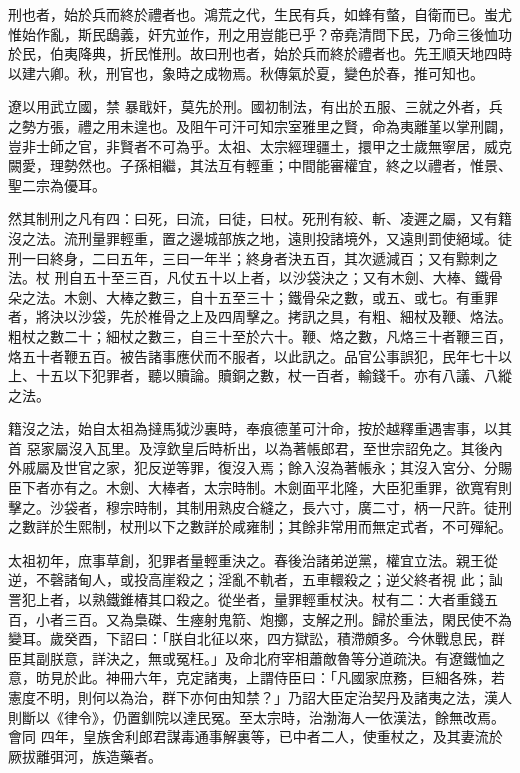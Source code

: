 
\begin{pinyinscope}

 刑也者，始於兵而終於禮者也。鴻荒之代，生民有兵，如蜂有螫，自衛而已。蚩尤惟始作亂，斯民鴟義，奸宄並作，刑之用豈能已乎？帝堯清問下民，乃命三後恤功於民，伯夷降典，折民惟刑。故曰刑也者，始於兵而終於禮者也。先王順天地四時以建六卿。秋，刑官也，象時之成物焉。秋傳氣於夏，變色於春，推可知也。



 遼以用武立國，禁
 暴戢奸，莫先於刑。國初制法，有出於五服、三就之外者，兵之勢方張，禮之用未遑也。及阻午可汗可知宗室雅里之賢，命為夷離堇以掌刑闢，豈非士師之官，非賢者不可為乎。太祖、太宗經理疆土，擐甲之士歲無寧居，威克闕愛，理勢然也。子孫相繼，其法互有輕重；中間能審權宜，終之以禮者，惟景、聖二宗為優耳。



 然其制刑之凡有四：曰死，曰流，曰徒，曰杖。死刑有絞、斬、凌遲之屬，又有籍沒之法。流刑量罪輕重，置之邊城部族之地，遠則投諸境外，又遠則罰使絕域。徒刑一曰終身，二曰五年，三曰一年半；終身者決五百，其次遞減百；又有黥刺之法。杖
 刑自五十至三百，凡仗五十以上者，以沙袋決之；又有木劍、大棒、鐵骨朵之法。木劍、大棒之數三，自十五至三十；鐵骨朵之數，或五、或七。有重罪者，將決以沙袋，先於椎骨之上及四周擊之。拷訊之具，有粗、細杖及鞭、烙法。粗杖之數二十；細杖之數三，自三十至於六十。鞭、烙之數，凡烙三十者鞭三百，烙五十者鞭五百。被告諸事應伏而不服者，以此訊之。品官公事誤犯，民年七十以上、十五以下犯罪者，聽以贖論。贖銅之數，杖一百者，輸錢千。亦有八議、八縱之法。



 籍沒之法，始自太祖為撻馬狘沙裏時，奉痕德堇可汁命，按於越釋重遇害事，以其首
 惡家屬沒入瓦里。及淳欽皇后時析出，以為著帳郎君，至世宗詔免之。其後內外戚屬及世官之家，犯反逆等罪，復沒入焉；餘入沒為著帳永；其沒入宮分、分賜臣下者亦有之。木劍、大棒者，太宗時制。木劍面平北隆，大臣犯重罪，欲寬宥則擊之。沙袋者，穆宗時制，其制用熟皮合縫之，長六寸，廣二寸，柄一尺許。徒刑之數詳於生熙制，杖刑以下之數詳於咸雍制；其餘非常用而無定式者，不可殫紀。



 太祖初年，庶事草創，犯罪者量輕重決之。春後治諸弟逆黨，權宜立法。親王從逆，不磬諸甸人，或投高崖殺之；淫亂不軌者，五車轘殺之；逆父終者視
 此；訕詈犯上者，以熟鐵錐椿其口殺之。從坐者，量罪輕重杖決。杖有二：大者重錢五百，小者三百。又為梟磔、生瘞射鬼箭、炮擲，支解之刑。歸於重法，閑民使不為變耳。歲癸酉，下詔曰：「朕自北征以來，四方獄訟，積滯頗多。今休戰息民，群臣其副朕意，詳決之，無或冤枉。」及命北府宰相蕭敵魯等分道疏決。有遼鐵恤之意，昉見於此。神冊六年，克定諸夷，上謂侍臣曰：「凡國家庶務，巨細各殊，若憲度不明，則何以為治，群下亦何由知禁？」乃詔大臣定治契丹及諸夷之法，漢人則斷以《律令》，仍置釧院以達民冤。至太宗時，治渤海人一依漢法，餘無改焉。會同
 四年，皇族舍利郎君謀毒通事解裏等，已中者二人，使重杖之，及其妻流於厥拔離弭河，族造藥者。




\end{pinyinscope}
